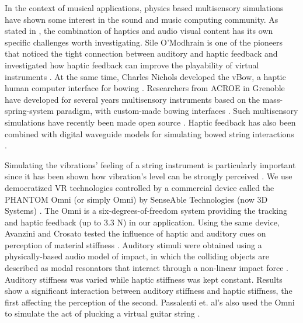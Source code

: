 \documentclass[dvipsnames, pdftex]{article}
\begin{document}
In the context of musical applications, physics based multisensory simulations have shown some interest in the sound and music computing community. 
As stated in 
\cite{danieau2012enhancing}, the combination of haptics and audio visual content has its own specific challenges worth investigating.
Sile O'Modhrain is one of the pioneers that noticed the tight connection between auditory and haptic feedback and investigated how haptic feedback can improve the playability of virtual instruments \cite{o2001playing}.
At the same time, Charles Nichols developed the vBow, a haptic human computer interface for bowing \cite{nichols2002vbow}.
Researchers from ACROE in Grenoble have developed for several years multisensory instruments based on the mass-spring-system paradigm, with custom-made bowing interfaces \cite{florens1990modeles,luciani2005action}.
Such multisensory simulations have recently been made open source \cite{villeneuve2019mass}.
Haptic feedback has also been combined with digital waveguide models for simulating bowed string interactions \cite{sinclair2009audio}.

Simulating the vibrations' feeling of a string instrument is particularly important since it has been shown how vibration's level can be strongly perceived \cite{askenfelt1992vibration}. 
We use democratized VR technologies controlled by a commercial device called the PHANTOM Omni (or simply Omni) by SenseAble Technologies (now 3D Systems) \cite{phantom}.
The Omni is a six-degrees-of-freedom system providing the tracking and haptic feedback (up to 3.3 N) in our application.
Using the same device, Avanzini and Crosato tested the influence of haptic and auditory cues on perception of material stiffness   \cite{avanzini2006}.
Auditory stimuli were obtained using a physically-based audio model of impact, in which the colliding objects are described as modal resonators that interact through a non-linear impact force \cite{avanzini2004physical}.
Auditory stiffness was varied while haptic stiffness was kept constant. Results show a significant interaction between auditory stiffness and haptic stiffness, the first affecting the perception of the second. Passalenti et. al's also used the Omni to simulate the act of plucking a virtual guitar string \cite{passalenti2019a, passalenti2019b, Fontana2020}.

\end{document}
